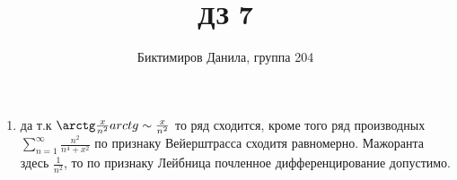 \documentclass[11pt]{article}
\begin{document}
	
	\author{Биктимиров Данила, группа 204}
	\title{ДЗ 7}
	\date{}
	\maketitle
	
	\medskip
	
	\begin{enumerate}
		
		\item да т.к $\arctg\frac{x}{n^2}arctg\sim \frac{x}{n^2}$ то ряд сходится, кроме того ряд производных $\sum_{n=1}^{\infty} \frac{n^2}{n^4+x^2}$ по признаку Вейерштрасса сходитя равномерно. Мажоранта здесь $\frac{1}{n^2}$, то по признаку Лейбница почленное дифференцирование допустимо.
	\end{enumerate}
\end{document}
